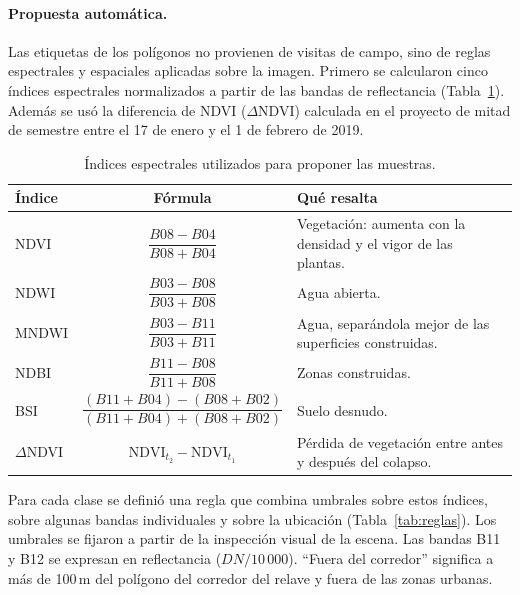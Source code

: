 \documentclass{article}
\begin{document}
\paragraph{Propuesta automática.}
Las etiquetas de los polígonos no provienen de visitas de campo, sino de reglas espectrales y espaciales aplicadas sobre la imagen. Primero se calcularon cinco índices espectrales normalizados a partir de las bandas de reflectancia (Tabla~\ref{tab:indices}). Además se usó la diferencia de NDVI ($\Delta$NDVI) calculada en el proyecto de mitad de semestre entre el 17 de enero y el 1 de febrero de 2019.

\begin{table}[htbp]
 \centering
 \small
 \caption{Índices espectrales utilizados para proponer las muestras.}
 \label{tab:indices}
 \begin{tabularx}{\textwidth}{lcX}
  \toprule
  Índice & Fórmula & Qué resalta \\
  \midrule
  NDVI \parencite{Rouse1974} & $\dfrac{B08 - B04}{B08 + B04}$ & Vegetación: aumenta con la densidad y el vigor de las plantas. \\[8pt]
  NDWI \parencite{McFeeters1996} & $\dfrac{B03 - B08}{B03 + B08}$ & Agua abierta. \\[8pt]
  MNDWI \parencite{Xu2006} & $\dfrac{B03 - B11}{B03 + B11}$ & Agua, separándola mejor de las superficies construidas. \\[8pt]
  NDBI \parencite{Zha2003} & $\dfrac{B11 - B08}{B11 + B08}$ & Zonas construidas. \\[8pt]
  BSI \parencite{Rikimaru2002} & $\dfrac{(B11 + B04) - (B08 + B02)}{(B11 + B04) + (B08 + B02)}$ & Suelo desnudo. \\[8pt]
  $\Delta$NDVI & $\mathrm{NDVI}_{t_2} - \mathrm{NDVI}_{t_1}$ & Pérdida de vegetación entre antes y después del colapso. \\
  \bottomrule
 \end{tabularx}
\end{table}

Para cada clase se definió una regla que combina umbrales sobre estos índices, sobre algunas bandas individuales y sobre la ubicación (Tabla~\ref{tab:reglas}). Los umbrales se fijaron a partir de la inspección visual de la escena. Las bandas B11 y B12 se expresan en reflectancia ($DN/10\,000$). \enquote{Fuera del corredor} significa a más de 100\,m del polígono del corredor del relave y fuera de las zonas urbanas.
\end{document}
